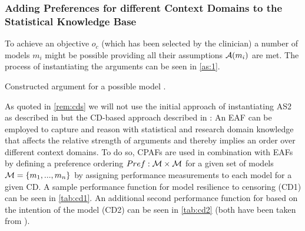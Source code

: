 \subsubsection{Adding Preferences for different Context Domains to the Statistical Knowledge Base}
\label{sub:preferences}

To achieve an objective $o_c$ (which has been selected by the clinician) a number of models $m_i$ might be possible providing all their assumptions $\mathcal{A}(m_i)$ are met. The process of instantiating the arguments can be seen in \cref{as:1}.

\begin{as}[tb]
	\centering
	\caption{Constructed argument for a possible model \cite{sassoon2014}. 	\label{as:1}}

\end{as}

As quoted in \cref{rem:cds} we will not use the initial approach of instantiating AS2 as described in \cite{sassoon2014} but the \gls{CD}-based approach described in \cite{sassoon2016,sassoon2016CD}: An \gls{EAF} can be employed to capture and reason with statistical and research domain knowledge that affects the relative strength of arguments and thereby implies an order over different context domains. To do so, \glspl{CPAF} are used in combination with \glspl{EAF} by defining a preference ordering $Pref : \mathcal{M} \times \mathcal{M}$ for a given set of models $\mathcal{M} = \{m_1, ..., m_n\}$ by assigning performance measurements to each model for a given \gls{CD}. A sample performance function for model resilience to censoring (CD1) can be seen in \autoref{tab:cd1}. An additional second performance function for based on the intention of the model (CD2) can be seen in \autoref{tab:cd2} (both have been taken from \cite{sassoon2016CD}).


